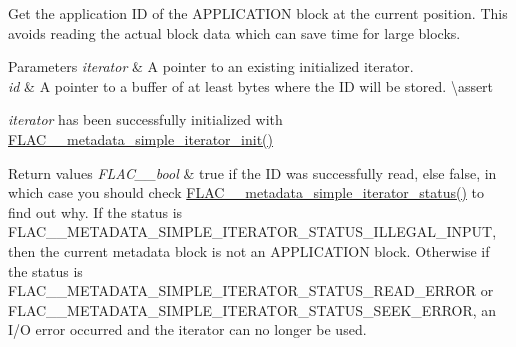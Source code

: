 Get the application ID of the {\ttfamily A\+P\+P\+L\+I\+C\+A\+T\+I\+ON} block at the current position. This avoids reading the actual block data which can save time for large blocks.


\begin{DoxyParams}{Parameters}
{\em iterator} & A pointer to an existing initialized iterator. \\
\hline
{\em id} & A pointer to a buffer of at least {} bytes where the ID will be stored. \textbackslash{}assert 
\begin{DoxyCode}{1}
\end{DoxyCode}
 
\begin{DoxyCode}{1}
\end{DoxyCode}
 {\itshape iterator} has been successfully initialized with \mbox{\hyperlink{group__flac__metadata__level1_ga2a055cca4e6e06ae62517c8b0fa6e8a3}{F\+L\+A\+C\+\_\+\+\_\+metadata\+\_\+simple\+\_\+iterator\+\_\+init()}} \\
\hline
\end{DoxyParams}

\begin{DoxyRetVals}{Return values}
{\em F\+L\+A\+C\+\_\+\+\_\+bool} & {\ttfamily true} if the ID was successfully read, else {\ttfamily false}, in which case you should check \mbox{\hyperlink{group__flac__metadata__level1_ga68cfafa2323154f3ee1d3061eafe109f}{F\+L\+A\+C\+\_\+\+\_\+metadata\+\_\+simple\+\_\+iterator\+\_\+status()}} to find out why. If the status is {\ttfamily F\+L\+A\+C\+\_\+\+\_\+\+M\+E\+T\+A\+D\+A\+T\+A\+\_\+\+S\+I\+M\+P\+L\+E\+\_\+\+I\+T\+E\+R\+A\+T\+O\+R\+\_\+\+S\+T\+A\+T\+U\+S\+\_\+\+I\+L\+L\+E\+G\+A\+L\+\_\+\+I\+N\+P\+UT}, then the current metadata block is not an {\ttfamily A\+P\+P\+L\+I\+C\+A\+T\+I\+ON} block. Otherwise if the status is {\ttfamily F\+L\+A\+C\+\_\+\+\_\+\+M\+E\+T\+A\+D\+A\+T\+A\+\_\+\+S\+I\+M\+P\+L\+E\+\_\+\+I\+T\+E\+R\+A\+T\+O\+R\+\_\+\+S\+T\+A\+T\+U\+S\+\_\+\+R\+E\+A\+D\+\_\+\+E\+R\+R\+OR} or {\ttfamily F\+L\+A\+C\+\_\+\+\_\+\+M\+E\+T\+A\+D\+A\+T\+A\+\_\+\+S\+I\+M\+P\+L\+E\+\_\+\+I\+T\+E\+R\+A\+T\+O\+R\+\_\+\+S\+T\+A\+T\+U\+S\+\_\+\+S\+E\+E\+K\+\_\+\+E\+R\+R\+OR}, an I/O error occurred and the iterator can no longer be used. \\
\hline
\end{DoxyRetVals}
\mbox{\label{group__flac__metadata__level1_ga31c9e013b3bdc04866eee2271349fe60}} 
